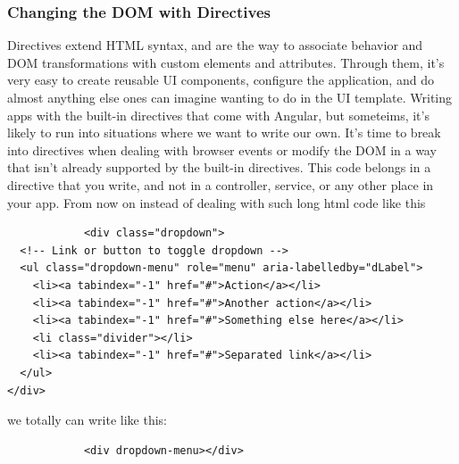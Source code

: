 \documentclass[14pt,a4paper]{extreport}
\begin{document}
			\subsubsection{Changing the DOM with Directives}
			Directives extend HTML syntax, and are the way to associate behavior and DOM transformations with custom elements and attributes. Through them, it's very easy to create reusable UI components, configure the application, and do almost anything else ones can imagine wanting to do in the UI template. Writing apps with the built-in directives that come with Angular, but someteims, it's likely to run into situations where we want to write our own. It’s time to break into directives when dealing with browser events or modify the DOM in a way that isn’t already supported by the built-in directives. This code belongs in a directive that you write, and not in a controller, service, or any other place in your app.
			From now on instead of dealing with such long html code like this 
			\begin{verbatim}
			<div class="dropdown">
  <!-- Link or button to toggle dropdown -->
  <ul class="dropdown-menu" role="menu" aria-labelledby="dLabel">
    <li><a tabindex="-1" href="#">Action</a></li>
    <li><a tabindex="-1" href="#">Another action</a></li>
    <li><a tabindex="-1" href="#">Something else here</a></li>
    <li class="divider"></li>
    <li><a tabindex="-1" href="#">Separated link</a></li>
  </ul>
</div>
			\end{verbatim}
			we totally can write like this: 
			\begin{verbatim}
			<div dropdown-menu></div>
			\end{verbatim}
\end{document}
